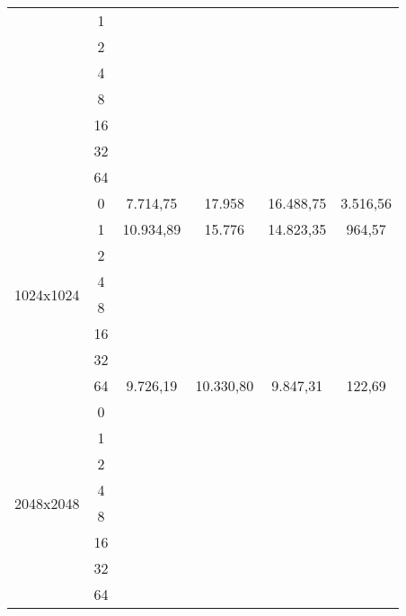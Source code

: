 \begin{table}[!h]
\begin{tabular}{|c|c|cccc|}
		& 1                                 &      &      &        &                \\
		& 2                                 &      &      &        &                \\
		& 4                                 &      &      &        &                \\
		& 8                                 &      &      &        &                \\
		& 16                                &      &      &        &                \\
		& 32                                &      &      &        &                \\
		& 64                                &      &      &        &               \\ \hline
		\multirow{8}{*}{1024x1024}      & 0                                & 7.714,75     &   17.958   &  16.488,75      &  3.516,56              \\
		& 1            &   10.934,89   & 15.776       &   14.823,35 & 964,57             \\
		& 2                                 &      &      &        &                \\
		& 4                                 &      &      &        &                \\
		& 8                                 &      &      &        &                \\
		& 16                                &      &      &        &                \\
		& 32                                &      &      &        &                \\
		& 64                                &    9.726,19  &  10.330,80    &    9.847,31    &     122,69          \\ \hline
		\multirow{8}{*}{2048x2048}      & 0                                &      &      &        &                \\
		& 1                                 &      &      &        &                \\
		& 2                                 &      &      &        &                \\
		& 4                                 &      &      &        &                \\
		& 8                                 &      &      &        &                \\
		& 16                                &      &      &        &                \\
		& 32                                &      &      &        &                \\
		& 64                                &      &      &        &               \\ \hline
	\end{tabular}
\end{table}
\twocolumn